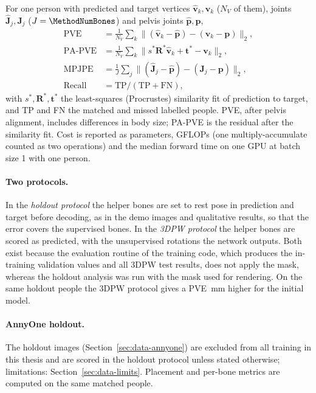 

For one person with predicted and target vertices $\hat{\mathbf v}_k,\mathbf v_k$ ($N_V$ of them), joints
$\hat{\mathbf J}_j,\mathbf J_j$ ($J=\MethodNumBones$) and pelvis joints $\hat{\mathbf p},\mathbf p$,
\begin{align}
 \mathrm{PVE} &= \tfrac{1}{N_V}\textstyle\sum_{k}\big\|(\hat{\mathbf v}_k-\hat{\mathbf p})-(\mathbf v_k-\mathbf p)\big\|_2 ,
\label{eq:metric-pve}\\
 \mathrm{PA\text{-}PVE} &= \tfrac{1}{N_V}\textstyle\sum_{k}\big\|s^\ast\mathbf R^\ast\hat{\mathbf v}_k+\mathbf t^\ast-\mathbf v_k\big\|_2 ,
\label{eq:metric-papve}\\
 \mathrm{MPJPE} &= \tfrac{1}{J}\textstyle\sum_{j}\big\|(\hat{\mathbf J}_j-\hat{\mathbf p})-(\mathbf J_j-\mathbf p)\big\|_2 ,
\label{eq:metric-mpjpe}\\
 \mathrm{Recall} &= \mathrm{TP}/(\mathrm{TP}+\mathrm{FN}) ,
\label{eq:metric-recall}
\end{align}
with $s^\ast,\mathbf R^\ast,\mathbf t^\ast$ the least-squares (Procrustes) similarity fit of prediction to target,
and TP and FN the matched and missed labelled people. PVE, after pelvis alignment, includes differences in body size;
PA-PVE is the residual after the similarity fit. Cost is
reported as parameters, GFLOPs (one multiply-accumulate counted as two operations) and the median forward time on one
GPU at batch size 1 with one person.

\paragraph{Two protocols.} In the \emph{holdout protocol} the helper bones are set to rest pose in prediction and target before decoding, as in the demo images and qualitative results,
so that the error covers the \MethodActiveBones{} supervised bones. In the \emph{3DPW protocol} the helper bones are
scored as predicted, with the unsupervised rotations the network outputs. Both exist because the
evaluation routine of the training code, which produces the in-training validation values and all 3DPW test results,
does not apply the mask, whereas the holdout analysis was run with the mask used for rendering. On the
same holdout people the 3DPW protocol gives a PVE \MethodVzeroGap\,mm higher for the initial model.

\paragraph{AnnyOne holdout.} The \MethodHoldoutN{} holdout images (Section~\ref{sec:data-annyone}) are excluded from
all training in this thesis and are scored in the holdout protocol unless stated otherwise; limitations:
Section~\ref{sec:data-limits}. Placement and per-bone metrics are computed on the same matched people.

